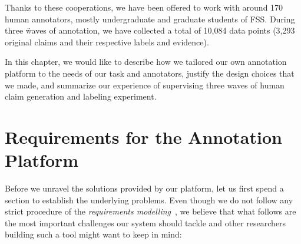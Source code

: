 Thanks to these cooperations, we have been offered to work with around 170 human annotators, mostly undergraduate and graduate students of \textsf{FSS}. During three \"{waves} of annotation, we have collected a total of 10,084 data points (3,293 original claims and their respective labels and evidence).

In this chapter, we would like to describe how we tailored our own annotation platform to the needs of our task and annotators, justify the design choices that we made, and summarize our experience of supervising three waves of human claim generation and labeling experiment.


\section{Requirements for the Annotation Platform}
\label{sec:requirements}
Before we unravel the solutions provided by our platform, let us first spend a section to establish the underlying problems. Even though we do not follow any strict procedure of the \textit{requirements modelling}~\cite{requirements}, we believe that what follows are the most important challenges our system should tackle and other researchers building such a tool might want to keep in mind:

